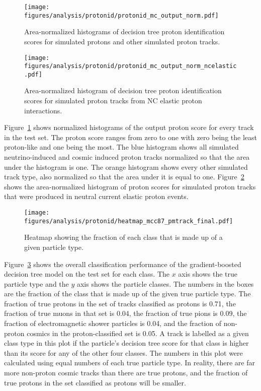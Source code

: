     \begin{figure}[ht]
      \centering
      \texttt{[image: figures/analysis/protonid/protonid\_mc\_output\_norm.pdf]}
      \caption{Area-normalized histograms of decision tree proton
      identification scores for simulated protons and other simulated proton
      tracks.}
      \label{fig:pidmcout}
    \end{figure}
    \begin{figure}[ht]
      \centering
      \texttt{[image: figures/analysis/protonid/protonid\_mc\_output\_norm\_ncelastic.pdf]}
      \caption{Area-normalized histogram of decision tree proton identification
      scores for simulated proton tracks from NC elastic proton interactions.}
      \label{fig:pidmcoutNCE}
    \end{figure}
    Figure~\ref{fig:pidmcout} shows normalized histograms of the output proton
    score for every track in the test set. The proton score ranges from zero to
    one with zero being the least proton-like and one being the most. The blue
    histogram shows all simulated neutrino-induced and cosmic induced proton
    tracks normalized so that the area under the histogram is one. The orange
    histogram shows every other simulated track type, also normalized so that
    the area under it is equal to one. Figure~\ref{fig:pidmcoutNCE} shows the
    area-normalized histogram of proton scores for simulated proton tracks that
    were produced in neutral current elastic proton events.

    \begin{figure}[ht]
      \centering
      \texttt{[image: figures/analysis/protonid/heatmap\_mcc87\_pmtrack\_final.pdf]}
      \caption{Heatmap showing the fraction of each class that is made up of a
      given particle type.}
      \label{fig:heatmap}
    \end{figure}
    Figure~\ref{fig:heatmap} shows the overall classification performance of
    the gradient-boosted decision tree model on the test set for each class.
    The $x$ axis shows the true particle type and the $y$ axis shows the
    particle classes. The numbers in the boxes are the fraction of the class
    that is made up of the given true particle type. The fraction of true
    protons in the set of tracks classified as protons is 0.71, the fraction of
    true muons in that set is 0.04, the fraction of true pions is 0.09, the
    fraction of electromagnetic shower particles is 0.04, and the fraction of
    non-proton cosmics in the proton-classified set is 0.05. A track is
    labelled as a given class type in this plot if the particle's decision tree
    score for that class is higher than its score for any of the other four
    classes.  The numbers in this plot were calculated using equal numbers of
    each true particle type. In reality, there are far more non-proton cosmic
    tracks than there are true protons, and the fraction of true protons in the
    set classified as protons will be smaller.

